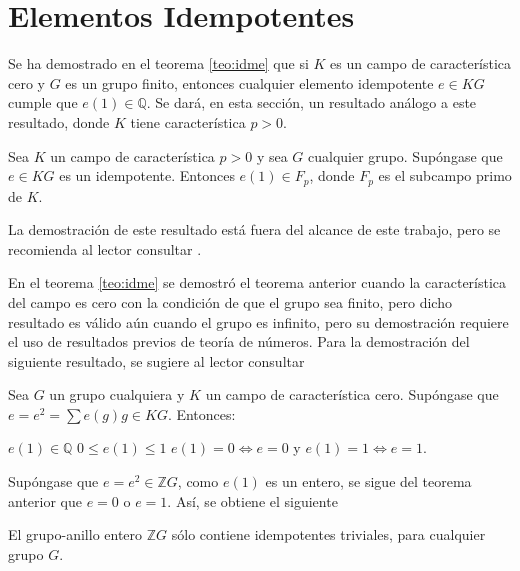 \section{\quad Elementos Idempotentes}
Se ha demostrado en el teorema \ref{teo:idme} que si $K$ es un campo de característica cero y $G$ es un grupo finito, entonces cualquier elemento idempotente $e \in KG$ cumple que $e(1) \in \mathds{Q}$. Se dará, en esta sección, un resultado análogo a este resultado, donde $K$ tiene característica $p > 0$.

\begin{teorema}\label{teo:genidem}
Sea $K$ un campo de característica $p > 0$ y sea $G$ cualquier grupo. Supóngase que $e \in KG$ es un idempotente. Entonces $e(1) \in F_p$, donde $F_p$ es el subcampo primo de $K$. 
\end{teorema}

La demostración de este resultado está fuera del alcance de este trabajo, pero se recomienda al lector consultar \cite{bib:passman}. 

En el teorema \ref{teo:idme} se demostró el teorema anterior cuando la característica del campo es cero con la condición de que el grupo sea finito, pero dicho resultado es válido aún cuando el grupo es infinito, pero su demostración requiere el uso de resultados previos de teoría de números. Para la demostración del siguiente resultado, se sugiere al lector consultar \cite{bib:passman}

\begin{teorema}\label{teo:genidem23}
Sea $G$ un grupo cualquiera y $K$ un campo de característica cero. Supóngase que $e = e^2 = \sum e(g)g \in KG$. Entonces:
\begin{bulletList}
\newItem $e(1) \in \mathds{Q}$
\newItem $0\leq e(1) \leq 1$
\newItem $e(1) = 0 \Leftrightarrow e= 0 $ y $e(1) = 1 \Leftrightarrow e = 1$. 
\end{bulletList}
\end{teorema} 

Supóngase que $e = e^2 \in \mathds{Z}G$, como $e(1)$ es un entero, se sigue del teorema anterior que $e = 0$ o $e = 1$. Así, se obtiene el siguiente
\begin{corolario}
El grupo-anillo entero $\mathds{Z}G$ sólo contiene idempotentes triviales, para cualquier grupo $G$.
\end{corolario}
